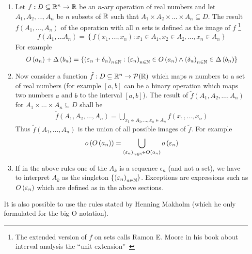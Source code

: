 \begin{enumerate}
  \item Let $f:D\subseteq\mathbb R^n\to\mathbb R$ be an $n$-ary operation of real numbers and let $A_1,A_2,\ldots,A_n$ be $n$ subsets of $\mathbb R$ such that $A_1\times A_2\times \dots\times A_n\subseteq D$. The result  $f\left(A_1,\ldots,A_n\right)$ of the operation with all $n$ sets is defined as the image of $f$ \footnote{The extended version of $f$ on sets calls Ramon E. Moore in his book about interval analysis the ``unit extension''~\cite[p. 18]{moore}}
\begin{align}
  f\left(A_1,\ldots A_n\right)=\left\{f(x_1,\ldots,x_n):x_1\in A_1,x_2\in A_2,\ldots,x_n\in A_n\right\}
\end{align}
  For example
  \begin{align}
    O\left( {a_n} \right) + \Delta\left( {b_n} \right) = \{ \left({\varepsilon_n+\delta_n}\right)_{{n}\in\mathbb N} : \left({\varepsilon_n}\right)_{{n}\in\mathbb N}\in O\left( {a_n} \right) \land \left({\delta_n}\right)_{{n}\in\mathbb N}\in\Delta\left( {b_n} \right)\}
  \end{align}

  \item Now consider a function $\tilde f:D\subseteq\mathbb R^n\to \mathcal P(\mathbb R)$ which maps $n$ numbers to a set of real numbers (for example $[a,b]$ can be a binary operation which maps two numbers $a$ and $b$ to the interval $[a,b]$). The result of $\tilde f\left(A_1,A_2,\ldots,A_n\right)$ for $A_1\times\dots\times A_n\subseteq D$ shall be
\begin{align}
  \tilde f\left(A_1,A_2,\ldots,A_n\right) = \bigcup_{x_1\in A_1, \ldots, x_n \in A_n} f(x_1,\ldots,x_n)
\end{align}
Thus $\tilde f(A_1,\ldots,A_n)$ is the union of all possible images of $\tilde f$. For example
\begin{align}
  o\left( {O\left( {a_n} \right)} \right) = \bigcup_{\left({\varepsilon_n}\right)_{{n}\in\mathbb N}\in O\left( {a_n} \right)} o\left( {\varepsilon_n} \right)
\end{align}

  \item If in the above rules one of the $A_k$ is a sequence $\epsilon_n$ (and not a set), we have to interpret $A_k$ as the singleton $\{\left({\varepsilon_n}\right)_{{n}\in\mathbb N}\}$. Exceptions are expressions such as $O\left( {\varepsilon_n} \right)$ which are defined as in the above sections.
\end{enumerate}

It is also possible to use the rules stated by Henning Makholm\cite{bigo_rules2} (which he only formulated for the big O notation).

